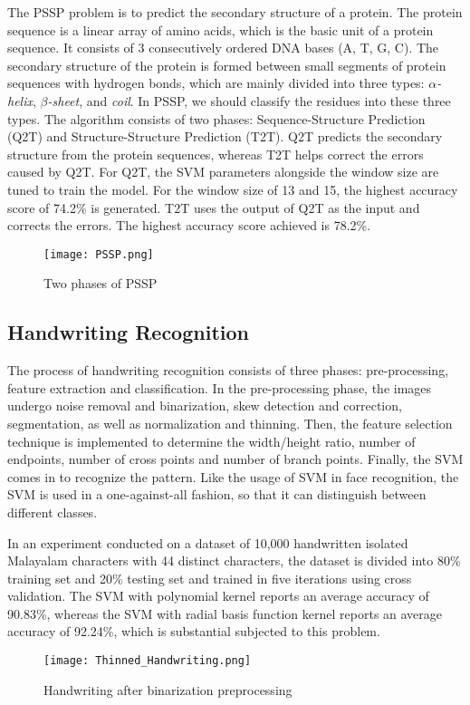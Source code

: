 The PSSP problem is to predict the secondary structure of a protein. The
protein sequence is a linear array of amino acids, which is the basic unit
of a protein sequence. It consists of 3 consecutively ordered DNA bases (A, T, G, C). 
The secondary structure of the protein is formed between small segments of 
protein sequences with hydrogen bonds, which are mainly divided into 
three types: \emph{$\alpha$-helix}, \emph{$\beta$-sheet}, and \emph{coil}. 
In PSSP, we should classify the residues into these three types.
The algorithm consists of two phases: Sequence-Structure Prediction (Q2T) and
Structure-Structure Prediction (T2T). Q2T predicts the secondary structure
from the protein sequences, whereas T2T helps correct the errors
caused by Q2T. For Q2T, the SVM parameters alongside the window size are tuned
to train the model. For the window size of 13 and 15, the highest accuracy score
of 74.2\% is generated. T2T uses the output of Q2T as the input and corrects
the errors. The highest accuracy score achieved is 78.2\%.
\cite{bioinformatics}
\begin{figure}[h]%
    \begin{center}%
        \texttt{[image: PSSP.png]}%
        \caption{Two phases of PSSP \cite{bioinformatics}}\label{fig:}%
    \end{center}%
\end{figure}

\subsection*{Handwriting Recognition}
The process of handwriting recognition consists of three phases:
pre-processing, feature extraction and classification. In the pre-processing
phase, the images undergo noise removal and binarization, skew detection
and correction, segmentation, as well as normalization and thinning. Then, 
the feature selection technique is implemented to determine the width/height
ratio, number of endpoints, number of cross points and number of branch
points. Finally, the SVM comes in to recognize the pattern. Like the usage of
SVM in face recognition, the SVM is used in a one-against-all fashion, so that
it can distinguish between different classes.

In an experiment conducted on a dataset of 10,000 handwritten isolated
Malayalam characters with 44 distinct characters, the dataset is divided
into 80\% training set and 20\% testing set and trained in five iterations
using cross validation. The SVM with polynomial kernel reports an average
accuracy of 90.83\%, whereas the SVM with radial basis function kernel
reports an average accuracy of 92.24\%, which is substantial subjected to 
this problem.
\cite{handwriting-recognition}
\begin{figure}[h]%
    \begin{center}%
        \texttt{[image: Thinned\_Handwriting.png]}%
        \caption{Handwriting after binarization preprocessing \cite{handwriting-recognition}}\label{fig:}%
    \end{center}%
\end{figure}
